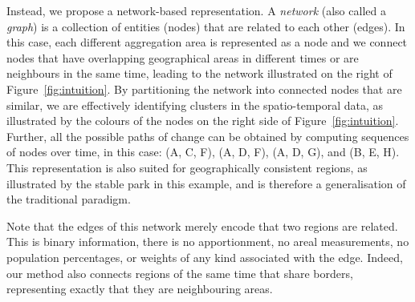 Instead, we propose a network-based representation. A \emph{network} (also
called a \emph{graph}) is a collection of entities (nodes) that are related to
each other (edges). In this case, each different aggregation area is represented
as a node and we connect nodes that have overlapping geographical areas in
different times or are neighbours in the same time, leading to the network
illustrated on the right of Figure~\ref{fig:intuition}. By partitioning the
network into connected nodes that are similar, we are effectively identifying
clusters in the spatio-temporal data, as illustrated by the colours of the nodes
on the right side of Figure~\ref{fig:intuition}. Further, all the possible paths
of change can be obtained by computing sequences of nodes over time, in this
case: (A, C, F), (A, D, F), (A, D, G), and (B, E, H). This representation is
also suited for geographically consistent regions, as illustrated by the stable
park in this example, and is therefore a generalisation of the traditional
paradigm.

Note that the edges of this network merely encode that two regions are related.
This is binary information, there is no apportionment, no areal measurements, no
population percentages, or weights of any kind associated with the edge. Indeed,
our method also connects regions of the same time that share borders,
representing exactly that they are neighbouring areas.